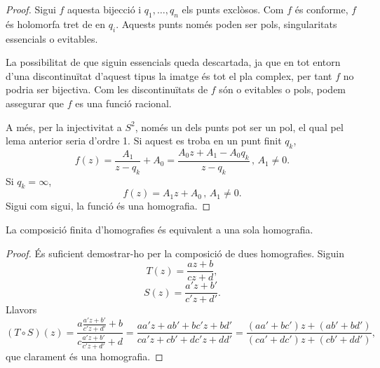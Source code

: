 \documentclass[dvipsnames, svgnames, leqno, a4paper, 12pt]{article}
\begin{document}
        \begin{proof}
            Sigui $f$ aquesta bijecció i $q_1,\dots,q_n$ els punts exclòsos. Com $f$ és conforme, $f$ és holomorfa tret de en $q_i$. Aquests punts només poden ser pols, singularitats essencials o evitables. 
            
            La possibilitat de que siguin essencials queda descartada, ja que en tot entorn d'una discontinuïtat d'aquest tipus la imatge és tot el pla complex, per tant $f$ no podria ser bijectiva. Com les discontinuïtats de $f$ són o evitables o pols, podem assegurar que $f$ es una funció racional. 
            
            A més, per la injectivitat a $S^2$, només un dels punts pot ser un pol, el qual pel lema anterior seria d'ordre 1. Si aquest es troba en un punt finit $q_k$, \begin{displaymath}
                f(z)=\frac{A_1}{z-q_k}+A_0=\frac{A_0z+A_1-A_0q_k}{z-q_k}\,\text{, } A_1\neq0.
            \end{displaymath}
            Si $q_k=\infty$, 
            \begin{displaymath}
                f(z)=A_1z+A_0\, \text{, } A_1\neq0.
            \end{displaymath}
            Sigui com sigui, la funció és una homografia.
        \end{proof}

        \begin{proposition}\label{prop:comp_homo}
            La composició finita d'homografies és equivalent a una sola homografia.
        \end{proposition}

        \begin{proof}
            És suficient demostrar-ho per la composició de dues homografies. Siguin 
            \begin{displaymath}
                T(z)=\frac{az+b}{cz+d},
            \end{displaymath}
            \begin{displaymath}
                S(z)=\frac{a'z+b'}{c'z+d'}.
            \end{displaymath}
            Llavors
            \begin{displaymath}
                (T\circ S)(z)=\frac{a\frac{a'z+b'}{c'z+d'}+b}{c\frac{a'z+b'}{c'z+d'}+d}=\frac{aa'z+ab'+bc'z+bd'}{ca'z+cb'+dc'z+dd'}=\frac{\left( aa'+bc' \right)z+(ab'+bd')}{\left( ca'+dc' \right)z+(cb'+dd')},
            \end{displaymath}
            \normalsize
            que clarament és una homografia.
        \end{proof}
\end{document}
